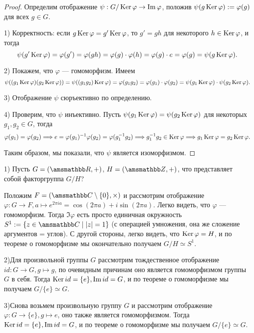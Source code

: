 \begin{proof}
    Определим отображение $\psi: G / \operatorname{Ker} \varphi \to \operatorname{Im} \varphi$, положив
    $\psi(g\operatorname{Ker} \varphi) := \varphi(g)$ для всех $g \in G$.

    1) Корректность: если $g\operatorname{Ker} \varphi = g'\operatorname{Ker} \varphi$, то
    $g' = gh$ для некоторого $h \in \operatorname{Ker} \varphi$, и тогда
    \[
        \psi(g'\operatorname{Ker} \varphi) = \varphi(g') = \varphi(gh) = \varphi(g) \cdot
        \varphi(h) = \varphi(g) \cdot e = \varphi(g) = \psi(g\operatorname{Ker}\varphi).
    \]

    2) Покажем, что $\varphi$ --- гомоморфизм. Имеем
    \[
        \psi((g_1\operatorname{Ker} \varphi)(g_2\operatorname{Ker}\varphi)) = \psi((g_1g_2)\operatorname{Ker}\varphi) =
        \varphi(g_1g_2) = \varphi(g_1) \cdot \varphi(g_2) = 
        \psi(g_1\operatorname{Ker}\varphi) \cdot \psi(g_2\operatorname{Ker}\varphi).
    \]
    
    3) Отображение $\psi$ сюръективно по определению.

    4) Проверим, что $\psi$ инъективно.
    Пусть $\psi(g_1\operatorname{Ker}\varphi) = \psi(g_2\operatorname{Ker}\varphi)$ для некоторых
    $g_1, g_2 \in G$, тогда
    \[
        \varphi(g_1) = \varphi(g_2) \Longrightarrow e = \varphi(g_1)^{-1} \varphi(g_2) =
        \varphi(g_1^{-1}g_2) \Longrightarrow g_1^{-1}g_2 \in \operatorname{Ker} \varphi \Longrightarrow g_1 \operatorname{Ker} \varphi = 
        g_2\operatorname{Ker}\varphi.
    \]

    Таким образом, мы показали, что $\psi$ является изоморфизмом.
\end{proof}
\vspace{0.3cm}
\begin{example}[ы]
    \setlength{\parindent}{0in} 
    1) Пусть $G = (\RR, +)$, $H = (\ZZ, +)$, что представляет
    собой факторгруппа $G / H$?

    Положим $F = (\CC \setminus \{0\}, \times)$ и рассмотрим отображение
    $\varphi: G \to F, a \mapsto e^{2\pi i a} = \cos(2\pi a) + i\sin(2\pi a)$.
    Легко видеть, что $\varphi$ --- гомоморфизм. Тогда $\Im \varphi$ есть просто
    единичная окружность \\ $S^{1} := \{z \in \CC \mid |z| = 1\}$
    (с операцией умножения, она же сложение аргументов = углов).
    С другой стороны, легко видеть, что $\operatorname{Ker} \varphi = H$,
    и по теореме о гомоморфизме мы окончательно получаем $G / H \simeq S^1$.
    
    2)Для произвольной группы $G$ рассмотрим тождественное отображение 
    $id: G \to G, g \mapsto g$, по очевидным причинам оно является гомоморфизмом группы $G$
    в себя. Тогда $\operatorname{Ker} id = \{e\}, \operatorname{Im} id = G$, и по теореме о гомоморфизме мы
    получаем $G / \{e\} \simeq G$.
    
    3)Снова возьмем произвольную группу $G$ и рассмотрим отображение
    $\varphi: G \to \{e\}, g \mapsto e$, оно также является гомоморфизмом.
    Тогда $\operatorname{Ker} id = \{e\}, \operatorname{Im} id = G$, и по теореме о гомоморфизме мы
    получаем $G / \{e\} \simeq G$.
\end{example}


